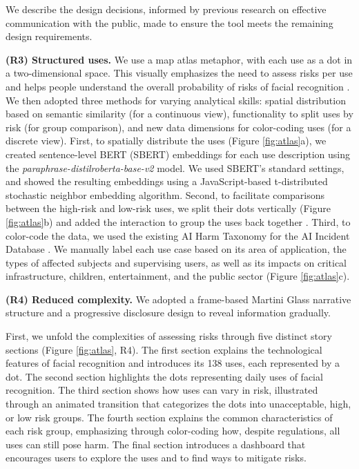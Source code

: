 We describe the design decisions, informed by previous research on effective communication with the public, made to ensure the tool meets the remaining design requirements.

\smallskip
\noindent\textbf{(R3) Structured uses.} 
We use a map atlas metaphor, with each use as a dot in a two-dimensional space. This visually emphasizes the need to assess risks per use and helps people understand the overall probability of risks of facial recognition \cite{visWhatWorks2021}. We then adopted three methods for varying analytical skills: spatial distribution based on semantic similarity (for a continuous view), functionality to split uses by risk (for group comparison), and new data dimensions for color-coding uses (for a discrete view). First, to spatially distribute the uses (Figure \ref{fig:atlas}a), we created sentence-level BERT (SBERT) embeddings for each use description using the \textit{paraphrase-distilroberta-base-v2} model. We used SBERT's standard settings, and showed the resulting embeddings using a JavaScript-based t-distributed stochastic neighbor embedding algorithm. Second, to facilitate comparisons between the high-risk and low-risk uses, we split their dots vertically (Figure \ref{fig:atlas}b) and added the interaction to group the uses back together \cite{visWhatWorks2021}. Third, to color-code the data, we used the existing AI Harm Taxonomy for the AI Incident Database \cite{harmTaxonomy}. We manually label each use case based on its area of application, the types of affected subjects and supervising users, as well as its impacts on critical infrastructure, children, entertainment, and the public sector (Figure \ref{fig:atlas}c).

\smallskip
\noindent\textbf{(R4) Reduced complexity.} 
We adopted a frame-based Martini Glass narrative structure \cite{narrativeViz} and a progressive disclosure design \cite{progressiveDisclosure} to reveal information gradually.

First, we unfold the complexities of assessing risks through five distinct story sections (Figure \ref{fig:atlas}, R4). The first section explains the technological features of facial recognition and introduces its 138 uses, each represented by a dot. The second section highlights the dots representing daily uses of facial recognition. The third section shows how uses can vary in risk, illustrated through an animated transition that categorizes the dots into unacceptable, high, or low risk groups. The fourth section explains the common characteristics of each risk group, emphasizing through color-coding how, despite regulations, all uses can still pose harm. The final section introduces a dashboard that encourages users to explore the uses and to find ways to mitigate risks.

